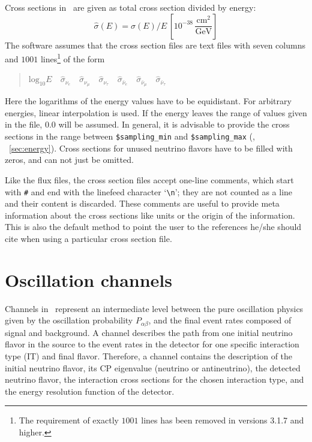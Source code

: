 Cross sections in \GLOBES\ are given as total cross section divided by energy:
\begin{equation}
\hat\sigma(E)=\sigma(E)/E\,\left[ 10^{-38}\,
\frac{\mathrm{cm}^2}{\mathrm{GeV}} \right]
\end{equation}
The software assumes that the cross section files are text files with 
seven columns and $1001$ lines\footnote{The requirement of exactly $1001$ lines 
has been removed in versions 3.1.7 and higher.}
of the form
\begin{quotation}
$\mathrm{log}_{10} E\quad
\hat\sigma_{\nu_e}\quad
\hat\sigma_{\nu_\mu}\quad
\hat\sigma_{\nu_\tau}\quad
\hat\sigma_{\bar\nu_e}\quad
\hat\sigma_{\bar\nu_\mu}\quad
\hat\sigma_{\bar\nu_\tau}$
\end{quotation}
Here the logarithms of the energy values have to be equidistant. For 
arbitrary energies, linear interpolation is used. If the energy leaves the
range of values given in the file, $0.0$ will be assumed. In general, it is advisable to provide the cross sections in the range between {\tt \$sampling\_min} and {\tt \$sampling\_max} (\cf, \Sec~\ref{sec:energy}).
Cross sections for unused neutrino flavors have to be filled with zeros, and
can not just be omitted.

Like the flux files, the cross section files 
accept one-line comments, which start
with {\tt \#} and end with the linefeed character `\verb+\n+'; they are
not counted as a line and their content is discarded. These comments
are useful to provide meta information about the cross sections like units
or the origin of the information. This is also the default method
to point the user to the references he/she should cite when using
a particular cross section file.

\section{Oscillation channels}
\label{sec:channel}

Channels in \GLOBES\ represent an intermediate level 
between the pure oscillation physics given by the oscillation probability
$P_{\alpha\beta}$, and the final event rates composed of signal and 
background. A channel describes the path from one
initial neutrino flavor in the source to the event rates in the detector for one specific interaction type (IT) and final flavor.  
Therefore, a channel contains the description of the 
initial neutrino flavor, its CP eigenvalue 
(neutrino or antineutrino), 
the detected neutrino flavor, the interaction cross sections for the chosen interaction type, and the energy resolution function of the detector.

